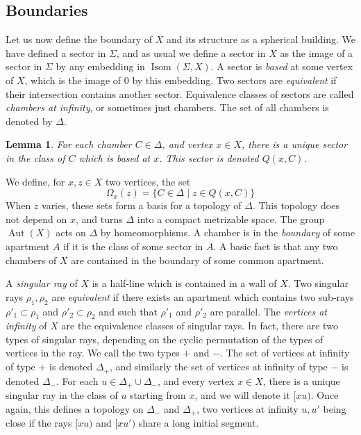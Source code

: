 \documentclass[a4paper, 11pt]{article}
\theoremstyle{plain}
\newtheorem{lemma}[proposition]{Lemma}
\theoremstyle{definition}
\theoremstyle{remark}
\DeclareMathOperator{\Aut}{Aut}
\DeclareMathOperator{\Isom}{Isom}
\begin{document}
\subsection{Boundaries}

Let us now define the boundary of $X$ and its structure as a spherical building. We have defined a sector in $\Sigma$, and as usual we define a sector in $X$ as the image of a sector in $\Sigma$ by any embedding in $\Isom(\Sigma,X)$. A sector is \emph{based} at some vertex of $X$, which is the image of $0$ by this embedding. Two sectors are \emph{equivalent} if their intersection contains another sector. Equivalence classes of sectors are called \emph{chambers at infinity}, or sometimes just chambers. The set of all chambers is denoted by $\Delta$.

\begin{lemma}
For each chamber $C\in \Delta$, and vertex $x\in X$, there is a unique sector in the class of $C$ which is based at $x$. This sector is denoted $Q(x,C)$.
\end{lemma}

We define, for $x,z\in X$ two vertices, the set
$$\Omega_x(z)=\{C\in \Delta\mid z\in Q(x,C)\}$$
When $z$ varies, these sets form a basis for a topology of $\Delta$. This topology does not depend on $x$, and turns $\Delta$ into a compact metrizable space. The group $\Aut(X)$ acts on $\Delta$ by homeomorphisms. A chamber is in the \emph{boundary} of some apartment $A$ if it is the class of some sector in $A$. A basic fact is that any two chambers of $X$ are contained in the boundary of some common apartment.



A \emph{singular ray} of $X$ is a half-line which is contained in a wall of $X$. Two singular rays $\rho_1,\rho_2$ are \emph{equivalent} if there exists an apartment which contains two sub-rays $\rho'_1\subset\rho_1$ and $\rho'_2\subset \rho_2$ and such that $\rho'_1$ and $\rho'_2$ are parallel. The \emph{vertices at infinity} of $X$ are the equivalence classes of singular rays. In fact, there are two types of singular rays, depending on the cyclic permutation of the types of vertices in the ray. We call the two types $+$ and $-$. The set of vertices at infinity of type $+$ is denoted $\Delta_+$, and similarly the set of vertices at infinity of type $-$ is denoted $\Delta_-$. 
For each $u\in \Delta_+\cup\Delta_-$, and every vertex $x\in X$, there is a unique singular ray in the class of $u$ starting from $x$, and we will denote it $[xu)$. Once again, this defines a topology on $\Delta_-$ and $\Delta_+$, two vertices at infinity $u,u'$ being close if the rays $[xu)$ and $[xu')$ share a long initial segment. 
\end{document}
